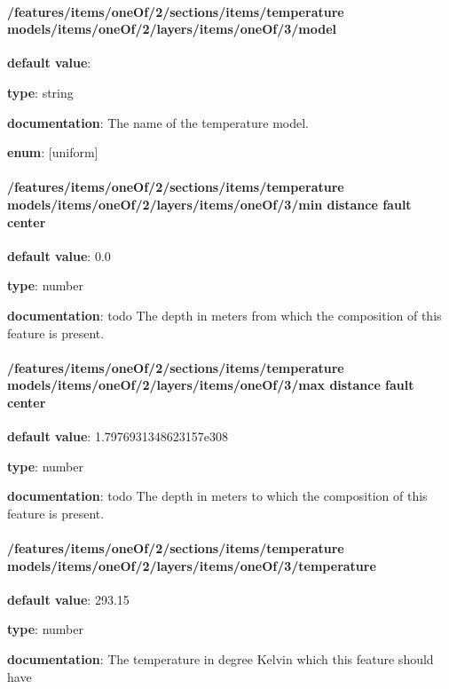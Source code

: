 \paragraph{/features/items/oneOf/2/sections/items/temperature models/items/oneOf/2/layers/items/oneOf/3/model} \begin{itemized}
\item {\bf default value}: 
\item {\bf type}: string
\item {\bf documentation}: The name of the temperature model.
\item {\bf enum}: [uniform]\end{itemized}\paragraph{/features/items/oneOf/2/sections/items/temperature models/items/oneOf/2/layers/items/oneOf/3/min distance fault center} \begin{itemized}
\item {\bf default value}: 0.0
\item {\bf type}: number
\item {\bf documentation}: todo The depth in meters from which the composition of this feature is present.
\end{itemized}\paragraph{/features/items/oneOf/2/sections/items/temperature models/items/oneOf/2/layers/items/oneOf/3/max distance fault center} \begin{itemized}
\item {\bf default value}: 1.7976931348623157e308
\item {\bf type}: number
\item {\bf documentation}: todo The depth in meters to which the composition of this feature is present.
\end{itemized}\paragraph{/features/items/oneOf/2/sections/items/temperature models/items/oneOf/2/layers/items/oneOf/3/temperature} \begin{itemized}
\item {\bf default value}: 293.15
\item {\bf type}: number
\item {\bf documentation}: The temperature in degree Kelvin which this feature should have

\end{itemized}

